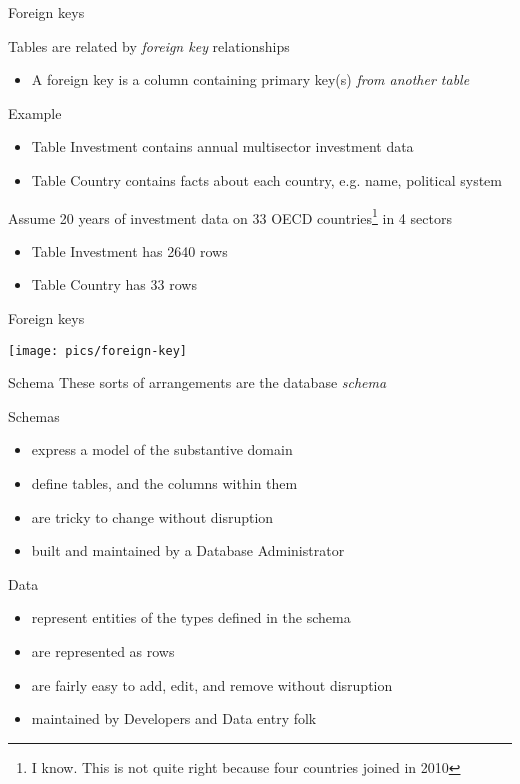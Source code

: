 \documentclass{hertieteaching}
\begin{document}
\begin{frame}{Foreign keys}

Tables are related by \textit{foreign key} relationships
\begin{itemize}
  \item A foreign key is a column containing primary key(s) \textit{from another table}
\end{itemize}
Example
\begin{itemize}
  \item Table \textsf{Investment} contains annual multisector investment data
  \item Table \textsf{Country} contains facts about each country, e.g. name, political system
\end{itemize}
Assume 20 years of investment data on 33 OECD countries\footnote{I know. This is not quite right because four countries joined in 2010} in 4 sectors
\begin{itemize}
  \item Table \textsf{Investment} has 2640 rows 
  \item Table \textsf{Country} has 33 rows 
\end{itemize}

\end{frame}

\begin{frame}{Foreign keys}
\medskip
\centerline{\texttt{[image: pics/foreign-key]}}  
\end{frame}

\begin{frame}{Schema}
These sorts of arrangements are the database \textit{schema}

Schemas 
\begin{itemize}
  \item express a model of the substantive domain
  \item define tables, and the columns within them
  \item are tricky to change without disruption
  \item built and maintained by a Database Administrator
\end{itemize}

Data 
\begin{itemize}
  \item represent entities of the types defined in the schema
  \item are represented as rows
  \item are fairly easy to add, edit, and remove without disruption
  \item maintained by Developers and Data entry folk
\end{itemize}

\end{frame}
\end{document}

